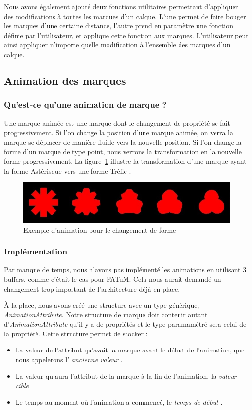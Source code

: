 \documentclass[12pt]{article}
\begin{document}
Nous avons également ajouté deux fonctions utilitaires permettant d'appliquer des modifications à toutes
les marques d'un calque. L'une permet de faire bouger les marques d'une certaine distance, l'autre prend
en paramètre une fonction définie par l'utilisateur, et applique cette fonction aux marques. L'utilisateur
peut ainsi appliquer n'importe quelle modification à l'ensemble des marques d'un calque.

\subsection{Animation des marques}
\subsubsection{Qu'est-ce qu'une animation de marque ?}

Une marque animée est une marque dont le changement de propriété se fait progressivement.
Si l'on change la position d'une marque animée, on verra la marque se déplacer de manière fluide vers la
nouvelle position. Si l'on change la forme d'un marque de type point, nous verrons la transformation en la nouvelle forme progressivement.
La figure~\ref{fig:anim-ex} illustre la transformation d'une marque ayant la forme \og Astérisque \fg vers une
forme \og Trèfle \fg.

\begin{figure}[htp]
  \centering
  \includegraphics[scale=0.8]{images/anim-exemple}
  \caption{Exemple d'animation pour le changement de forme}
  \label{fig:anim-ex}
\end{figure}

\subsubsection{Implémentation}

Par manque de temps, nous n'avons pas implémenté les animations en utilisant 3 buffers, comme c'était le
cas pour FATuM. Cela nous aurait demandé un changement trop important de l'architecture déjà en place.

À la place, nous avons créé une structure avec un type générique, \textit{AnimationAttribute}.
Notre structure de marque doit contenir autant d'\textit{AnimationAttribute} qu'il y a de propriétés et le
type paramamétré sera celui de la propriété.
Cette structure permet de stocker :
\begin{itemize}
\item La valeur de l'attribut qu'avait la marque avant le début de l'animation, que nous appelerons l'\og
\textit{ancienne valeur} \fg.
\item La valeur qu'aura l'attribut de la marque à la fin de l'animation, la \og \textit{valeur cible} \fg
\item Le temps au moment où l'animation a commencé, le \og \textit{temps de début} \fg.
\end{itemize}
\end{document}
